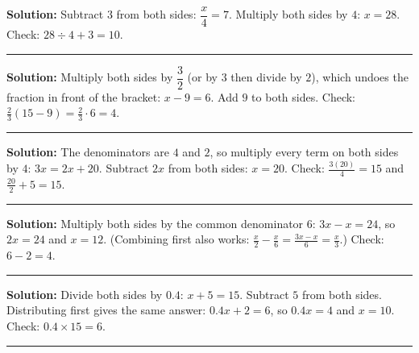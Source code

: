 \documentclass[12pt]{article}
\begin{document}



\textbf{Solution:} \quad Subtract $3$ from both sides: $\dfrac{x}{4} = 7$. Multiply both sides by
$4$: $x = 28$. Check: $28 \div 4 + 3 = 10$. 

\vspace{0.15cm}\noindent\rule{\linewidth}{0.2pt}


\textbf{Solution:} \quad Multiply both sides by $\dfrac{3}{2}$ (or by $3$ then divide by $2$), which
undoes the fraction in front of the bracket: $x - 9 = 6$. Add $9$ to both sides. Check:
$\frac{2}{3}(15 - 9) = \frac{2}{3}\cdot 6 = 4$. 

\vspace{0.15cm}\noindent\rule{\linewidth}{0.2pt}


\textbf{Solution:} \quad The denominators are $4$ and $2$, so multiply every term on both sides by
$4$: $3x = 2x + 20$. Subtract $2x$ from both sides: $x = 20$. Check:
$\frac{3(20)}{4} = 15$ and $\frac{20}{2} + 5 = 15$. 

\vspace{0.15cm}\noindent\rule{\linewidth}{0.2pt}


\textbf{Solution:} \quad Multiply both sides by the common denominator $6$:
$3x - x = 24$, so $2x = 24$ and $x = 12$. (Combining first also works:
$\frac{x}{2} - \frac{x}{6} = \frac{3x - x}{6} = \frac{x}{3}$.) Check: $6 - 2 = 4$. 

\vspace{0.15cm}\noindent\rule{\linewidth}{0.2pt}


\textbf{Solution:} \quad Divide both sides by $0.4$: $x + 5 = 15$. Subtract $5$ from both sides.
Distributing first gives the same answer: $0.4x + 2 = 6$, so $0.4x = 4$ and $x = 10$. Check:
$0.4 \times 15 = 6$. 

\vspace{0.15cm}\noindent\rule{\linewidth}{0.2pt}

\end{document}
